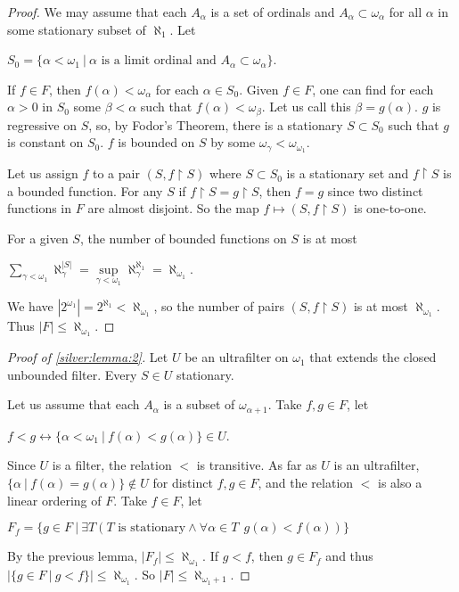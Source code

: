 \documentclass[8pt]{article}
\theoremstyle{definition}
\theoremstyle{definition}
\theoremstyle{definition}
\theoremstyle{definition}
\theoremstyle{definition}
\theoremstyle{definition}
\theoremstyle{definition}
\theoremstyle{definition}
\theoremstyle{definition}
\theoremstyle{definition}
\theoremstyle{definition}
\theoremstyle{definition}
\theoremstyle{definition}
\theoremstyle{definition}
\theoremstyle{question}
\begin{document}
\begin{proof}
  We may assume that each $A_{\alpha}$ is a set of ordinals and $A_{\alpha} \subset \omega_{\alpha}$
  for all $\alpha$ in some stationary subset of $\aleph_1$. Let
  \begin{center}
    $S_0 = \{ \alpha < \omega_1 \: | \: \text{$\alpha$ is a limit ordinal and $A_{\alpha} \subset \omega_{\alpha}$}\}$.
  \end{center}
If $f \in F$, then $f(\alpha) < \omega_{\alpha}$ for each $\alpha \in S_0$. Given $f \in F$,
one can find for each $\alpha > 0$ in $S_0$ some $\beta < \alpha$ such that $f(\alpha) < \omega_{\beta}$. Let us
call this $\beta = g(\alpha)$. $g$ is regressive on $S$, so, by Fodor's Theorem, there is a stationary $S \subset S_0$
such that $g$ is constant on $S_0$. $f$ is bounded on $S$ by some $\omega_{\gamma} < \omega_{\omega_1}$.

Let us assign $f$ to a pair $(S, f \upharpoonright S)$ where $S \subset S_0$ is a stationary set
and $f \upharpoonright S$ is a bounded function. For any $S$ if $f \upharpoonright S = g \upharpoonright S$, then $f = g$
since two distinct functions in $F$ are almost disjoint. So the map $f \mapsto (S, f \upharpoonright S)$ is one-to-one.

For a given $S$, the number of bounded functions on $S$ is at most
\begin{center}
  $\sum \limits_{\gamma < \omega_1} \aleph_{\gamma}^{|S|} = \sup \limits_{\gamma < \omega_1} \aleph^{\aleph_1}_{\gamma} = \aleph_{\omega_1}$.
\end{center}

We have $|2^{\omega_1}| = 2^{\aleph_1} < \aleph_{\omega_1}$, so the number of pairs $(S, f \upharpoonright S)$
is at most $\aleph_{\omega_1}$. Thus $|F| \leq \aleph_{\omega_1}$.
\end{proof}

\begin{proof}[Proof of \ref{silver:lemma:2}]
  Let $U$ be an ultrafilter on $\omega_1$ that extends the closed unbounded filter. Every $S \in U$ stationary.

  Let us assume that each $A_{\alpha}$ is a subset of $\omega_{\alpha + 1}$. Take $f, g \in F$, let
  \begin{center}
    $f < g \leftrightarrow \{ \alpha < \omega_1 \: | \: f(\alpha) < g(\alpha) \} \in U$.
  \end{center}
  Since $U$ is a filter, the relation $<$ is transitive. As far as $U$ is an ultrafilter, 
  $\{ \alpha \: | \: f(\alpha) = g(\alpha)\} \notin U$ for distinct $f, g \in F$, and the relation $<$ is also a linear
  ordering of $F$. Take $f \in F$, let
  \begin{center}
    $F_f = \{ g \in F \: | \: \exists T (\text{$T$ is stationary} \land \forall \alpha \in T \:\: g(\alpha) < f(\alpha))\}$
  \end{center}

  By the previous lemma, $|F_f| \leq \aleph_{\omega_1}$. If $g < f$, then $g \in F_f$ and thus 
  $|\{ g \in F \: | \: g < f \}| \leq \aleph_{\omega_1}$. So $|F| \leq \aleph_{\omega_1 + 1}$.
\end{proof}
\end{document}
